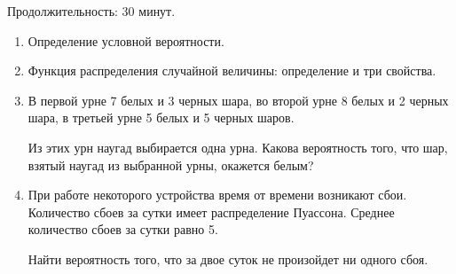 \documentclass[12pt]{article}
\begin{document}
\newpage
\setcounter{page}{2}
\mbox{}

\newpage
{}
\setcounter{page}{1}
Продолжительность: 30 минут.



\begin{enumerate}
  \item Определение условной вероятности.
  \item Функция распределения случайной величины: определение и три свойства.
  \item  В первой урне 7 белых и 3 черных шара, во второй урне 8 белых и 2 черных
  шара, в третьей урне 5 белых и 5 черных шаров.

  Из этих урн наугад выбирается одна урна.
  Какова вероятность того, что шар, взятый наугад из выбранной урны, окажется белым?

  \item При работе некоторого устройства время от времени возникают сбои.
  Количество сбоев за сутки имеет распределение Пуассона.
  Среднее количество сбоев за сутки равно 5.

  Найти вероятность того, что за двое суток не произойдет ни одного сбоя.
\end{enumerate}

\newpage
\setcounter{page}{2}
\mbox{}
\end{document}
